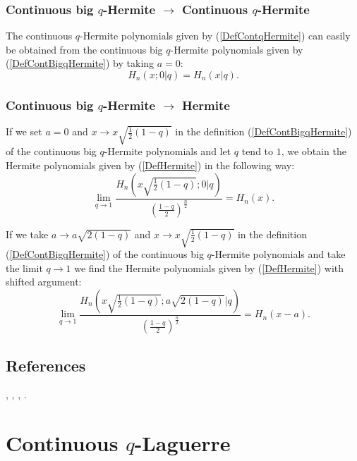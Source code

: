 \documentclass[envcountchap,graybox]{svmono}
\newcounter{rom}
\begin{document}
\subsubsection*{Continuous big $q$-Hermite $\rightarrow$ Continuous $q$-Hermite}
The continuous $q$-Hermite polynomials given by (\ref{DefContqHermite})
can easily be obtained from the continuous big $q$-Hermite polynomials given by
(\ref{DefContBigqHermite}) by taking $a=0$:
\begin{equation}
H_n(x;0|q)=H_n(x|q).
\end{equation}

\subsubsection*{Continuous big $q$-Hermite $\rightarrow$ Hermite}
If we set $a=0$ and $x\rightarrow x\sqrt{\frac{1}{2}(1-q)}$ in the
definition (\ref{DefContBigqHermite}) of the continuous big $q$-Hermite
polynomials and let $q$ tend to $1$, we obtain the Hermite polynomials given
by (\ref{DefHermite}) in the following way:
\begin{equation}
\lim_{q\rightarrow 1}
\frac{H_n(x\sqrt{\frac{1}{2}(1-q)};0|q)}
{\left(\frac{1-q}{2}\right)^{\frac{n}{2}}}=H_n(x).
\end{equation}

If we take $a\rightarrow a\sqrt{2(1-q)}$ and
$x\rightarrow x\sqrt{\frac{1}{2}(1-q)}$ in the definition
(\ref{DefContBigqHermite}) of the continuous big $q$-Hermite polynomials and
take the limit $q\rightarrow 1$ we find the Hermite polynomials given by
(\ref{DefHermite}) with shifted argument:
\begin{equation}
\lim_{q\rightarrow 1}
\frac{H_n(x\sqrt{\frac{1}{2}(1-q)};a\sqrt{2(1-q)}|q)}
{\left(\frac{1-q}{2}\right)^{\frac{n}{2}}}=H_n(x-a).
\end{equation}

\subsection*{References}
\cite{AskeyRahmanSuslov}, \cite{AtakAtakII}, \cite{AtakAtakIII},
\cite{Floreanini+95}.


\newpage

\section{Continuous $q$-Laguerre}
\par\setcounter{equation}{0}
\end{document}
